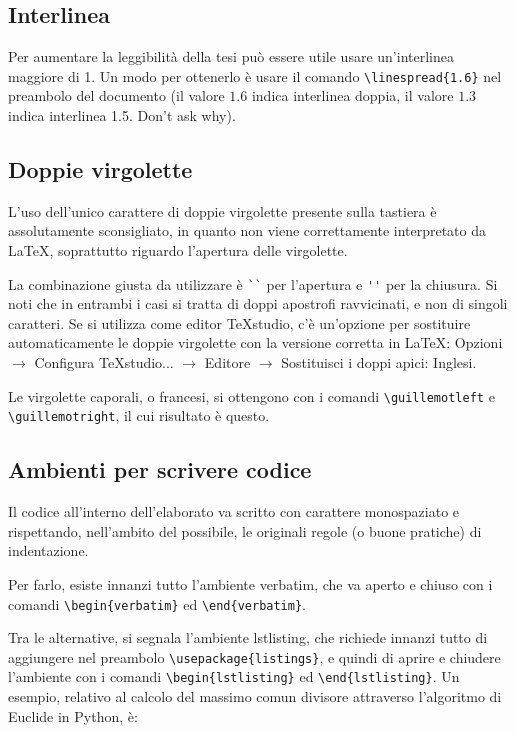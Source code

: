 \documentclass[12pt]{report}
\begin{document}
    \subsection{Interlinea}

    Per aumentare la leggibilit\`a della tesi pu\`o essere utile usare un'interlinea maggiore di 1. Un modo per ottenerlo \`e usare il comando \verb|\linespread{1.6}| nel preambolo del documento (il valore $1.6$ indica interlinea doppia, il valore $1.3$ indica interlinea 1.5. Don't ask why).


    \subsection{Doppie virgolette}

    L'uso dell'unico carattere di doppie virgolette presente sulla tastiera è assolutamente sconsigliato, in quanto non viene correttamente interpretato da \LaTeX, soprattutto riguardo l'apertura delle virgolette.

    La combinazione giusta da utilizzare è \verb|``| per l'apertura e \verb|''| per la chiusura. Si noti che in entrambi i casi si tratta di doppi apostrofi ravvicinati, e non di singoli caratteri. Se si utilizza come editor TeXstudio, c'è un'opzione per sostituire automaticamente le doppie virgolette con la versione corretta in \LaTeX: Opzioni $\rightarrow$ Configura TeXstudio... $\rightarrow$ Editore $\rightarrow$ Sostituisci i doppi apici: Inglesi.

    Le virgolette caporali, o francesi, si ottengono con i comandi \verb|\guillemotleft| e \break\verb|\guillemotright|, il cui risultato è \guillemotleft questo\guillemotright.


    \subsection{Ambienti per scrivere codice}

    Il codice all'interno dell'elaborato va scritto con carattere monospaziato e rispettando, nell'ambito del possibile, le originali regole (o buone pratiche) di indentazione.

    Per farlo, esiste innanzi tutto l'ambiente verbatim, che va aperto e chiuso con i comandi \verb|\begin{verbatim}| ed \verb|\end{verbatim}|.

    Tra le alternative, si segnala l'ambiente lstlisting, che richiede innanzi tutto di aggiungere nel preambolo \verb|\usepackage{listings}|, e quindi di aprire e chiudere l'ambiente con i comandi \verb|\begin{lstlisting}| ed \verb|\end{lstlisting}|. Un esempio, relativo al calcolo del massimo comun divisore attraverso l'algoritmo di Euclide in Python, è:
\end{document}
